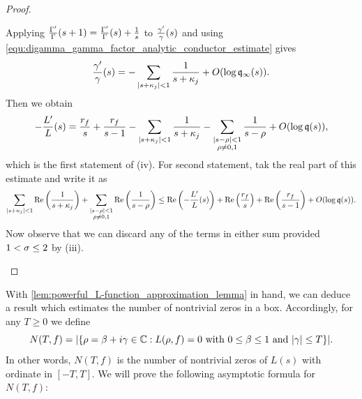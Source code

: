 \documentclass[12pt]{article}
\begin{document}
\begin{proof}
\begin{enumerate}[label*=(\roman*)]
\[        \]
        Applying \(\frac{\Gamma'}{\Gamma}(s+1) = \frac{\Gamma'}{\Gamma}(s)+\frac{1}{s}\) to \(\frac{\gamma'}{\gamma}(s)\) and using \cref{equ:digamma_gamma_factor_analytic_conductor_estimate} gives
        \[
          \frac{\gamma'}{\gamma}(s) = -\sum_{|s+\kappa_{j}| < 1}\frac{1}{s+\kappa_{j}}+O(\log{\mathfrak{q}_{\infty}(s)}).
        \]
        Then we obtain
        \[
          -\frac{L'}{L}(s) = \frac{r_{f}}{s}+\frac{r_{f}}{s-1}-\sum_{|s+\kappa_{j}| < 1}\frac{1}{s+\kappa_{j}}-\sum_{\substack{|s-\rho| < 1 \\ \rho \neq 0,1}}\frac{1}{s-\rho}+O(\log{\mathfrak{q}(s)}),
        \]
        which is the first statement of (iv). For second statement, tak the real part of this estimate and write it as
        \[
          \sum_{|s+\kappa_{j}| < 1}\mathrm{Re}\left(\frac{1}{s+\kappa_{j}}\right)+\sum_{\substack{|s-\rho| < 1 \\ \rho \neq 0,1}}\mathrm{Re}\left(\frac{1}{s-\rho}\right) \le \mathrm{Re}\left(-\frac{L'}{L}(s)\right)+\mathrm{Re}\left(\frac{r_{f}}{s}\right)+\mathrm{Re}\left(\frac{r_{f}}{s-1}\right)+O(\log{\mathfrak{q}(s)}).
        \]
        Now observe that we can discard any of the terms in either sum provided \(1 < \sigma \le 2\) by (iii).
      \end{enumerate}
    \end{proof}

    With \cref{lem:powerful_L-function_approximation_lemma} in hand, we can deduce a result which estimates the number of nontrivial zeros in a box. Accordingly, for any \(T \ge 0\) we define
    \[
      N(T,f) = |\{\rho = \beta+i\gamma \in \mathbb{C}:L(\rho,f) = 0 \text{ with } 0 \le \beta \le 1 \text{ and } |\gamma| \le T\}|.
    \]
    In other words, \(N(T,f)\) is the number of nontrivial zeros of \(L(s)\) with ordinate in \([-T,T]\). We will prove the following asymptotic formula for \(N(T,f)\):
\end{document}
